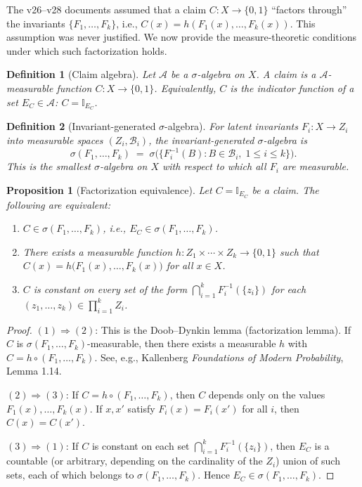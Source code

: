 \documentclass[11pt]{article}
\newtheorem{definition}{Definition}
\newtheorem{proposition}{Proposition}
\begin{document}
The v26--v28 documents assumed that a claim $C\colon X\to\{0,1\}$ ``factors through'' the invariants $\{F_1,\ldots,F_k\}$, i.e., $C(x)=h(F_1(x),\ldots,F_k(x))$. This assumption was never justified. We now provide the measure-theoretic conditions under which such factorization holds.

\begin{definition}[Claim algebra]
Let $\mathcal{A}$ be a $\sigma$-algebra on $X$. A \emph{claim} is a $\mathcal{A}$-measurable function $C\colon X\to\{0,1\}$. Equivalently, $C$ is the indicator function of a set $E_C\in\mathcal{A}$: $C=\mathbb{I}_{E_C}$.
\end{definition}

\begin{definition}[Invariant-generated $\sigma$-algebra]
For latent invariants $F_i\colon X\to Z_i$ into measurable spaces $(Z_i,\mathcal{B}_i)$, the \emph{invariant-generated $\sigma$-algebra} is
\[
\sigma(F_1,\ldots,F_k)\;=\;\sigma\!\bigl(\{F_i^{-1}(B):B\in\mathcal{B}_i,\;1\leq i\leq k\}\bigr).
\]
This is the smallest $\sigma$-algebra on $X$ with respect to which all $F_i$ are measurable.
\end{definition}

\begin{proposition}[Factorization equivalence]\label{prop:factorization}
Let $C=\mathbb{I}_{E_C}$ be a claim. The following are equivalent:
\begin{enumerate}
\item $C\in\sigma(F_1,\ldots,F_k)$, i.e., $E_C\in\sigma(F_1,\ldots,F_k)$.
\item There exists a measurable function $h\colon Z_1\times\cdots\times Z_k\to\{0,1\}$ such that $C(x)=h\bigl(F_1(x),\ldots,F_k(x)\bigr)$ for all $x\in X$.
\item $C$ is constant on every set of the form $\bigcap_{i=1}^k F_i^{-1}(\{z_i\})$ for each $(z_1,\ldots,z_k)\in\prod_{i=1}^k Z_i$.
\end{enumerate}
\end{proposition}

\begin{proof}
$(1)\Rightarrow(2)$: This is the Doob--Dynkin lemma (factorization lemma). If $C$ is $\sigma(F_1,\ldots,F_k)$-measurable, then there exists a measurable $h$ with $C=h\circ(F_1,\ldots,F_k)$. See, e.g., Kallenberg \emph{Foundations of Modern Probability}, Lemma 1.14.

$(2)\Rightarrow(3)$: If $C=h\circ(F_1,\ldots,F_k)$, then $C$ depends only on the values $F_1(x),\ldots,F_k(x)$. If $x,x'$ satisfy $F_i(x)=F_i(x')$ for all $i$, then $C(x)=C(x')$.

$(3)\Rightarrow(1)$: If $C$ is constant on each set $\bigcap_{i=1}^k F_i^{-1}(\{z_i\})$, then $E_C$ is a countable (or arbitrary, depending on the cardinality of the $Z_i$) union of such sets, each of which belongs to $\sigma(F_1,\ldots,F_k)$. Hence $E_C\in\sigma(F_1,\ldots,F_k)$.
\end{proof}
\end{document}
